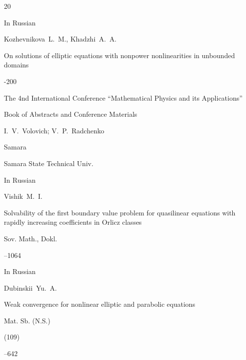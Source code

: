 \begin{thebibliography}{20}




\lang In Russian

\by Kozhevnikova~L.~M., Khadzhi~A.~A.

\paper On solutions of elliptic equations with nonpower nonlinearities in unbounded domains

-200

\inbook  The 4nd International Conference ``Mathematical Physics and its Applications''

\bookinfo Book of Abstracts and Conference Materials

\eds I.~V.~Volovich; V.~P.~Radchenko

\publaddr Samara

\publ Samara State Technical Univ.










\lang In Russian

\by Vishik~M.~I.

\paper Solvability of the first boundary value problem for quasilinear equations with rapidly increasing coefficients in Orlicz classes

\jour Sov. Math., Dokl.


--1064









\lang In Russian

\by Dubinskii~Yu.~A.

\paper Weak convergence for nonlinear elliptic and parabolic equations

\jour Mat. Sb. (N.S.)


(109)


--642





\end{thebibliography}
